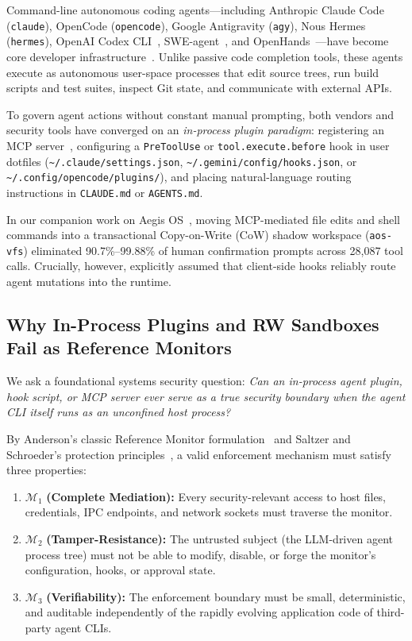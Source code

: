 \documentclass[10pt,twocolumn]{article}
\begin{document}
Command-line autonomous coding agents---including Anthropic Claude Code (\texttt{claude}), OpenCode (\texttt{opencode}), Google Antigravity (\texttt{agy}), Nous Hermes (\texttt{hermes}), OpenAI Codex CLI~\cite{openai2025codex}, SWE-agent~\cite{yang2024sweagent}, and OpenHands~\cite{wang2025openhands}---have become core developer infrastructure~\cite{jimenez2024swebench,anthropic2024mcp}. Unlike passive code completion tools, these agents execute as autonomous user-space processes that edit source trees, run build scripts and test suites, inspect Git state, and communicate with external APIs.

To govern agent actions without constant manual prompting, both vendors and security tools have converged on an \emph{in-process plugin paradigm}: registering an MCP server~\cite{anthropic2024mcp}, configuring a \texttt{PreToolUse} or \texttt{tool.execute.before} hook in user dotfiles (\texttt{\textasciitilde/.claude/\allowbreak settings.json}, \texttt{\textasciitilde/.gemini/\allowbreak config/\allowbreak hooks.json}, or \texttt{\textasciitilde/.config/\allowbreak opencode/\allowbreak plugins/}), and placing natural-language routing instructions in \texttt{CLAUDE.md} or \texttt{AGENTS.md}.

In our companion work on Aegis OS~\cite{zhao2026aegisos}, moving MCP-mediated file edits and shell commands into a transactional Copy-on-Write (CoW) shadow workspace (\texttt{aos-vfs}) eliminated 90.7\%--99.88\% of human confirmation prompts across 28,087 tool calls. Crucially, however, \cite{zhao2026aegisos} explicitly assumed that client-side hooks reliably route agent mutations into the runtime.

\subsection{Why In-Process Plugins and RW Sandboxes Fail as Reference Monitors}

We ask a foundational systems security question: \emph{Can an in-process agent plugin, hook script, or MCP server ever serve as a true security boundary when the agent CLI itself runs as an unconfined host process?}

By Anderson's classic Reference Monitor formulation~\cite{anderson1972computer} and Saltzer and Schroeder's protection principles~\cite{saltzer1975protection}, a valid enforcement mechanism must satisfy three properties:
\begin{enumerate}
    \item $\mathcal{M}_1$ \textbf{(Complete Mediation):} Every security-relevant access to host files, credentials, IPC endpoints, and network sockets must traverse the monitor.
    \item $\mathcal{M}_2$ \textbf{(Tamper-Resistance):} The untrusted subject (the LLM-driven agent process tree) must not be able to modify, disable, or forge the monitor's configuration, hooks, or approval state.
    \item $\mathcal{M}_3$ \textbf{(Verifiability):} The enforcement boundary must be small, deterministic, and auditable independently of the rapidly evolving application code of third-party agent CLIs.
\end{enumerate}
\end{document}
